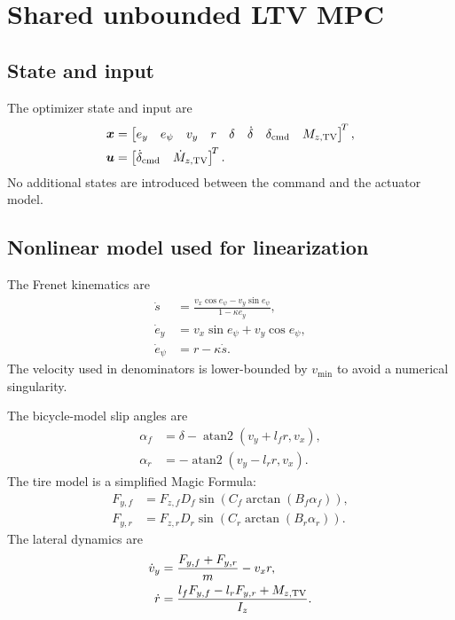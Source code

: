 \documentclass[11pt,a4paper]{article}
\newcommand{\vect}[1]{\bm{#1}}
\begin{document}
\section{Shared unbounded LTV MPC}

\subsection{State and input}

The optimizer state and input are
\begin{align}
\vect{x}&=
\begin{bmatrix}
e_y&e_\psi&v_y&r&\delta&\dot\delta&\delta_{\rm cmd}&M_{z,\rm TV}
\end{bmatrix}^{\!T},\\
\vect{u}&=
\begin{bmatrix}
\dot\delta_{\rm cmd}&\dot M_{z,\rm TV}
\end{bmatrix}^{\!T}.
\end{align}
No additional states are introduced between the command and the actuator
model.

\subsection{Nonlinear model used for linearization}

The Frenet kinematics are
\begin{align}
\dot s &=
\frac{v_x\cos e_\psi-v_y\sin e_\psi}{1-\kappa e_y},\\
\dot e_y&=v_x\sin e_\psi+v_y\cos e_\psi,\\
\dot e_\psi&=r-\kappa\dot s.
\end{align}
The velocity used in denominators is lower-bounded by $v_{\min}$ to avoid a
numerical singularity.

The bicycle-model slip angles are
\begin{align}
\alpha_f&=\delta-\operatorname{atan2}(v_y+l_fr,v_x),\\
\alpha_r&=-\operatorname{atan2}(v_y-l_rr,v_x).
\end{align}
The tire model is a simplified Magic Formula:
\begin{align}
F_{y,f}&=F_{z,f}D_f\sin\!\left(C_f\arctan(B_f\alpha_f)\right),\\
F_{y,r}&=F_{z,r}D_r\sin\!\left(C_r\arctan(B_r\alpha_r)\right).
\end{align}
The lateral dynamics are
\begin{align}
\dot v_y&=\frac{F_{y,f}+F_{y,r}}{m}-v_xr,\\
\dot r&=\frac{l_fF_{y,f}-l_rF_{y,r}+M_{z,\rm TV}}{I_z}.
\end{align}
\end{document}
